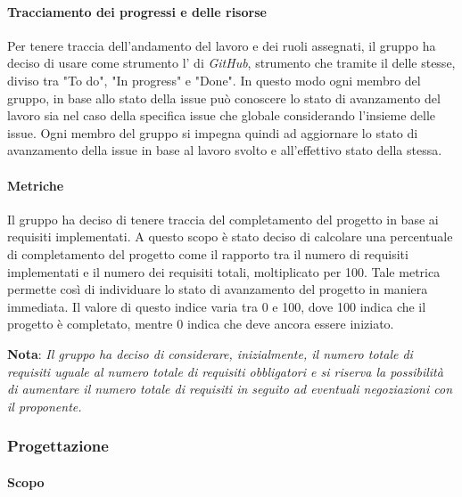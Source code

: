 \paragraph{Tracciamento dei progressi e delle risorse}
Per tenere traccia dell'andamento del lavoro e dei ruoli assegnati, il gruppo ha deciso di usare come strumento 
l' di \emph{GitHub}, strumento che tramite il  delle 
 stesse, diviso tra "To do", "In progress" e "Done". In questo modo ogni membro del gruppo, in 
base allo stato della issue può conoscere lo stato di avanzamento del lavoro sia nel caso della specifica issue
che globale considerando l'insieme delle issue. Ogni membro del gruppo si impegna quindi ad aggiornare lo stato
di avanzamento della issue in base al lavoro svolto e all'effettivo stato della stessa.

\paragraph{Metriche}

Il gruppo ha deciso di tenere traccia del completamento del progetto in base ai requisiti implementati. A questo scopo è 
stato deciso di calcolare una percentuale di completamento del progetto come il rapporto tra il numero di requisiti 
implementati e il numero dei requisiti totali, moltiplicato per 100. Tale metrica permette così di individuare lo stato 
di avanzamento del progetto in maniera immediata. Il valore di questo indice varia tra 0 e 100, dove 100 indica che il 
progetto è completato, mentre 0 indica che deve ancora essere iniziato.
\begin{center}
    \textbf{Nota}: \emph{Il gruppo ha deciso di considerare, inizialmente, il numero totale di requisiti uguale al numero totale di requisiti obbligatori e si riserva la 
    possibilità di aumentare il numero totale di requisiti in seguito ad eventuali negoziazioni con il proponente.}
\end{center}
 
\subsubsection{Progettazione}
 
\paragraph{Scopo}

